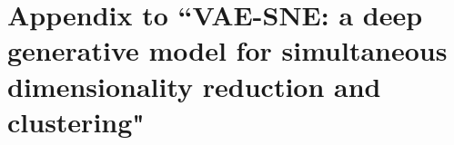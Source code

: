 \chapter[Appendix to VAE-SNE]{Appendix to ``VAE-SNE: a deep generative model for simultaneous dimensionality reduction and clustering"}
\newpage

\begin{table}[!htb]
\caption{  \textbf{Ranked information preservation metric performance for nonlinear dimension reduction algorithms}.
Rankings for each nonlinear dimension reduction algorithm in terms of general performance for local, global, fine-scale, and temporal structure preservation (lower is better).}
\label{table:info}

\end{table}

